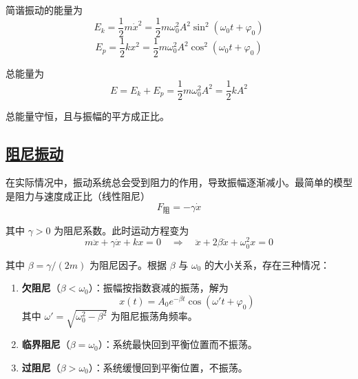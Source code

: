 简谐振动的能量为
\begin{equation}
    E_k = \frac{1}{2}m\dot{x}^2 = \frac{1}{2}m\omega_0^2 A^2\sin^2(\omega_0 t + \varphi_0)
\end{equation}
\begin{equation}
    E_p = \frac{1}{2}kx^2 = \frac{1}{2}m\omega_0^2 A^2\cos^2(\omega_0 t + \varphi_0)
\end{equation}

总能量为
\begin{equation}
    E = E_k + E_p = \frac{1}{2}m\omega_0^2 A^2 = \frac{1}{2}kA^2
\end{equation}

总能量守恒，且与振幅的平方成正比。

\subsection{\protect\hyperlink{:}{阻尼振动}}

在实际情况中，振动系统总会受到阻力的作用，导致振幅逐渐减小。最简单的模型是阻力与速度成正比（线性阻尼）
\begin{equation}
    F_{\text{阻}} = -\gamma\dot{x}
\end{equation}

其中 $\gamma > 0$ 为阻尼系数。此时运动方程变为
\begin{equation}
    m\ddot{x} + \gamma\dot{x} + kx = 0 \quad \Longrightarrow \quad \ddot{x} + 2\beta\dot{x} + \omega_0^2 x = 0
\end{equation}

其中 $\beta = \gamma / (2m)$ 为阻尼因子。根据 $\beta$ 与 $\omega_0$ 的大小关系，存在三种情况：

\begin{enumerate}
    \item \textbf{欠阻尼}（$\beta < \omega_0$）：振幅按指数衰减的振荡，解为
    \begin{equation}
        x(t) = A_0 e^{-\beta t}\cos(\omega' t + \varphi_0)
    \end{equation}
    其中 $\omega' = \sqrt{\omega_0^2 - \beta^2}$ 为阻尼振荡角频率。

    \item \textbf{临界阻尼}（$\beta = \omega_0$）：系统最快回到平衡位置而不振荡。

    \item \textbf{过阻尼}（$\beta > \omega_0$）：系统缓慢回到平衡位置，不振荡。
\end{enumerate}

